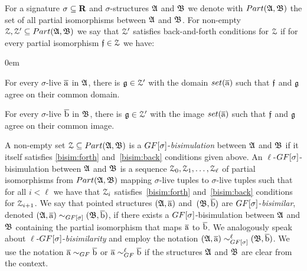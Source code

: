 For a signature $\sigma \subseteq \mathbf{R}$ and $\sigma$-structures ${\mathfrak{A}}$ and ${\mathfrak{B}}$ we denote with $\PartIso{\str{A}}{\str{B}}$ the set of all partial isomorphisms between ${\mathfrak{A}}$ and ${\mathfrak{B}}$. 
For non-empty $\bisimZ, \bisimZ' \subseteq \PartIso{\str{A}}{\str{B}}$ we say that $\mathcal{Z}'$ satisfies back-and-forth conditions for $\mathcal{Z}$ if for every partial isomorphism $\mathfrak{f} \in \mathcal{Z}$ we have:
%
\begin{description}\itemsep0em
  \item[\desclabel{(Forth)}{bisim:forth}] For every $\sigma$-live $\overline{\mathrm{a}}$ in ${\mathfrak{A}}$, there is $\mathfrak{g} \in \mathcal{Z}'$ with the domain $\set(\elemtuplea)$ such that $\mathfrak{f}$ and $\mathfrak{g}$ agree on their common domain. 
  \item[\desclabel{(Back)}{bisim:back}] For every $\sigma$-live $\overline{\mathrm{b}}$ in ${\mathfrak{B}}$, there is $\mathfrak{g} \in \mathcal{Z}'$ with the image $\set(\elemtuplea)$ such that $\mathfrak{f}$ and $\mathfrak{g}$ agree on their common image.
\end{description}
A non-empty set $\bisimZ \subseteq \PartIso{\str{A}}{\str{B}}$ is a $\GF[\sigma]$-\emph{bisimulation} between ${\mathfrak{A}}$ and ${\mathfrak{B}}$ if it itself satisfies \ref{bisim:forth} and~\ref{bisim:back} conditions given above. 
An $\ell$-$\GF[\sigma]$-bisimulation between ${\mathfrak{A}}$ and ${\mathfrak{B}}$ is a sequence $\mathcal{Z}_0, \mathcal{Z}_1, \ldots, \mathcal{Z}_\ell$ of partial isomorphisms from $\PartIso{\str{A}}{\str{B}}$ mapping $\sigma$-live tuples to $\sigma$-live tuples  such that for all $i < \ell$ we have that $\mathcal{Z}_i$ satisfies~\ref{bisim:forth} and~\ref{bisim:back} conditions for $\mathcal{Z}_{i{+}1}$.
We say that pointed structures $({\mathfrak{A}}, \overline{\mathrm{a}})$ and~$({\mathfrak{B}}, \overline{\mathrm{b}})$ are $\GF[\sigma]$-\emph{bisimilar}, denoted $(\str{A}, \elemtuplea) \bisimto_{\GF[\sigma]} (\str{B}, \elemtupleb)$, if there exists a $\GF[\sigma]$-bisimulation  between ${\mathfrak{A}}$ and ${\mathfrak{B}}$ containing the partial isomorphism that maps $\overline{\mathrm{a}}$ to $\overline{\mathrm{b}}$.
We analogously speak about $\ell$-$\GF[\sigma]$-\emph{bisimilarity} and employ the notation $(\str{A}, \elemtuplea) \bisimto_{\GF[\sigma]}^{\ell} (\str{B}, \elemtupleb)$.
We use the notation $\elemtuplea \bisimto_{\GF} \elemtupleb$ or $\elemtuplea \bisimto_{\GF}^{\ell} \elemtupleb$ if the structures ${\mathfrak{A}}$ and ${\mathfrak{B}}$ are clear from the context.

